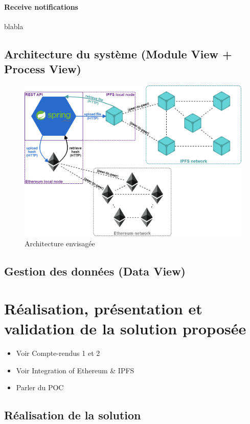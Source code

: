 \documentclass{tnreport}
\begin{document}
\subsubsection{Receive notifications}
blabla

\section{Architecture du système (Module View + Process View)}

\begin{figure}[h]
	\centering
	\includegraphics[scale=0.4]{figures/architecture}
	\caption{Architecture envisagée}
	\label{fig:architecture}
\end{figure}

\section{Gestion des données (Data View)}

\chapter{Réalisation, présentation et validation de la solution proposée}
\label{sec:realisation}

\begin{itemize}
	\item Voir Compte-rendus 1 et 2
	\item Voir Integration of Ethereum \& IPFS
	\item Parler du POC
\end{itemize}

\section{Réalisation de la solution}
\end{document}

